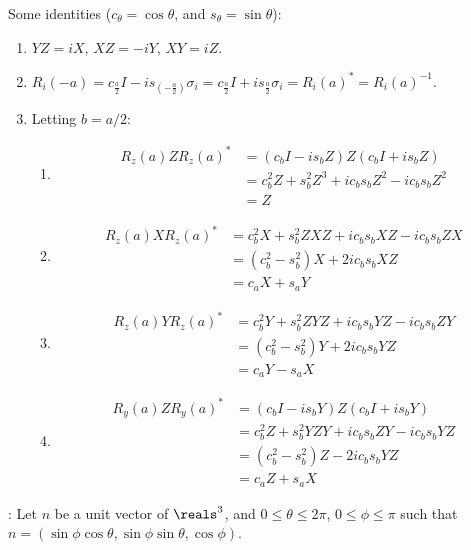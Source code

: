 \begingroup
\newcommand{\roto}[2]{R_{#1} \left( #2 \right)}
%
\par Some identities ($c_\theta = \cos \theta$, and $s_\theta = \sin \theta$):
%
\begin{enumerate}
\item $YZ = iX$, $XZ = -iY$, $XY = iZ$.
%
\item $\roto{i}{-a} = c_{\frac{a}{2}} I - i s_{\left( -\frac{a}{2} \right)} \sigma_i = c_{\frac{a}{2}} I + i s_{\frac{a}{2}} \sigma_i = \roto{i}{a}^* = \roto{i}{a}^{-1}$.
%
\item Letting $b = a/2$:
%
\begin{enumerate}
\item \begin{align*}
\roto{z}{a} Z \roto{z}{a}^* &= \left( c_b I - i s_b Z \right) Z \left( c_b I + i s_b Z \right) \\
&= c_b^2 Z + s_b^2 Z^3 + i c_b s_b Z^2 - i c_b s_b Z^2 \\
&= Z
\end{align*}
%
\item \begin{align*}
\roto{z}{a} X \roto{z}{a}^* &= c_b^2 X + s_b^2 ZXZ + i c_b s_b XZ - i c_b s_b ZX \\
&= \left( c_b^2 - s_b^2 \right) X + 2 i c_b s_b XZ \\
&= c_a X + s_a Y
\end{align*}
%
\item \begin{align*}
\roto{z}{a} Y \roto{z}{a}^* &= c_b^2 Y + s_b^2 ZYZ + i c_b s_b YZ - i c_b s_b ZY \\
&= \left( c_b^2 - s_b^2 \right) Y + 2 i c_b s_b YZ \\
&= c_a Y - s_a X
\end{align*}
%
\item \begin{align*}
\roto{y}{a} Z \roto{y}{a}^* &= \left( c_b I - i s_b Y \right) Z \left( c_b I + i s_b Y \right) \\
&= c_b^2 Z + s_b^2 YZY + i c_b s_b ZY - i c_b s_b YZ \\
&= \left( c_b^2 - s_b^2 \right) Z - 2 i c_b s_b YZ \\
&= c_a Z + s_a X
\end{align*}
\end{enumerate}
\end{enumerate}
%
: Let $n$ be a unit vector of $\reals^3$, and $0 \le \theta \le 2 \pi$, $0 \le \phi \le \pi$ such that $n = \left( \sin \phi \cos \theta, \sin \phi \sin \theta, \cos \phi \right)$.
